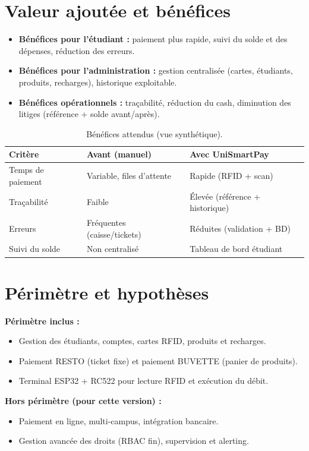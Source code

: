 \documentclass[12pt,a4paper]{report}
\begin{document}
\section{Valeur ajoutée et bénéfices}
\begin{itemize}
  \item \textbf{Bénéfices pour l’étudiant :} paiement plus rapide, suivi du solde et des dépenses, réduction des erreurs.
  \item \textbf{Bénéfices pour l’administration :} gestion centralisée (cartes, étudiants, produits, recharges), historique exploitable.
  \item \textbf{Bénéfices opérationnels :} traçabilité, réduction du cash, diminution des litiges (référence + solde avant/après).
\end{itemize}

\begin{table}[H]
\centering
\begin{tabular}{p{} p{} p{}}
\toprule
\textbf{Critère} & \textbf{Avant (manuel)} & \textbf{Avec UniSmartPay}\\
\midrule
Temps de paiement & Variable, files d’attente & Rapide (RFID + scan)\\
Traçabilité & Faible & Élevée (référence + historique)\\
Erreurs & Fréquentes (caisse/tickets) & Réduites (validation + BD)\\
Suivi du solde & Non centralisé & Tableau de bord étudiant\\
\bottomrule
\end{tabular}
\caption{Bénéfices attendus (vue synthétique).}
\end{table}

\section{Périmètre et hypothèses}
\textbf{Périmètre inclus :}
\begin{itemize}
  \item Gestion des étudiants, comptes, cartes RFID, produits et recharges.
  \item Paiement RESTO (ticket fixe) et paiement BUVETTE (panier de produits).
  \item Terminal ESP32 + RC522 pour lecture RFID et exécution du débit.
\end{itemize}

\textbf{Hors périmètre (pour cette version) :}
\begin{itemize}
  \item Paiement en ligne, multi-campus, intégration bancaire.
  \item Gestion avancée des droits (RBAC fin), supervision et alerting.
\end{itemize}
\end{document}
